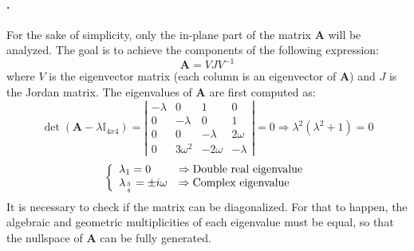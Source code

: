 			\paragraph{ . \\}
			\indent For the sake of simplicity, only the in-plane part of the matrix $\bm A$ will be analyzed. The goal is to achieve the components of the following expression:
			\[
			\bm A = V J V^{-1}		
			\]
			\noindent where $V$ is the eigenvector matrix (\ie each column is an eigenvector of $\bm A$) and $J$ is the Jordan matrix. The eigenvalues of $\bm A$ are first computed as:
			\[
			\det \left(\bm A - \lambda \mathbb{I}_{4x4} \right) = \left\lvert \begin{array}{cccc}
			-\lambda 	& 0			& 1			& 0			\\
			0			& -\lambda 	& 0 		& 1			\\
			0			& 0			& -\lambda	& 2 \omega	\\
			0			& 3\omega^2	& -2\omega	& - \lambda
			\end{array}\right\rvert = 0 \Rightarrow \lambda^2 (\lambda^2 + 1) = 0
			\]
			\begin{equation}
			\left\{ \begin{array}{ll}
			\lambda_{1} = 0 & \Rightarrow \text{Double real eigenvalue} \\
			\lambda_{3\atop 4} = \pm i \omega & \Rightarrow \text{Complex eigenvalue} 
			\end{array}\right.
			\end{equation}
			\indent It is necessary to check if the matrix can be diagonalized. For that to happen, the algebraic and geometric multiplicities of each eigenvalue must be equal, so that the nullspace of $\bm A$ can be fully generated. 
